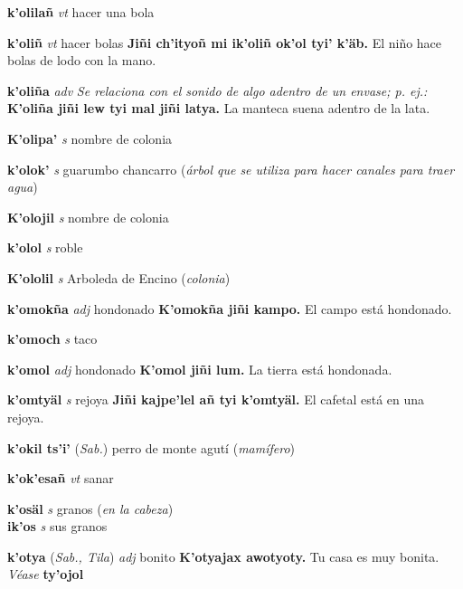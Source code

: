 \documentclass[10pt]{scrbook}
\newcommand{\entry}[1]{\textbf{#1}}
\newcommand{\nontranslationdef}[1]{\textit{#1}}
\newcommand{\partofspeech}[1]{\textit{#1}}
\newcommand{\spanishtranslation}[1]{#1}
\newcommand{\clarification}[1]{(\textit{#1})}
\newcommand{\cholexample}[1]{\textbf{#1}}
\newcommand{\exampletranslation}[1]{#1}
\newcommand{\alsosee}[1]{\\\textit{Véase} \textbf{#1}}
\newcommand{\relevantdialect}[1]{(\textit{#1})}
\newcommand{\secondaryentry}[1]{\\\textbf{#1}}
\newcommand{\secondpartofspeech}[1]{\textit{#1}}
\newcommand{\secondtranslation}[1]{#1}
\begin{document}
\begin{multicols}{2}
\entry{k'olilañ}
\partofspeech{vt}
\spanishtranslation{hacer una bola}

\entry{k'oliñ}
\partofspeech{vt}
\spanishtranslation{hacer bolas}
\cholexample{Jiñi ch'ityoñ mi ik'oliñ ok'ol tyi' k'äb.}
\exampletranslation{El niño hace bolas de lodo con la mano.}

\entry{k'oliña}
\partofspeech{adv}
\nontranslationdef{Se relaciona con el sonido de algo adentro de un envase; p. ej.:}
\cholexample{K'oliña jiñi lew tyi mal jiñi latya.}
\exampletranslation{La manteca suena adentro de la lata.}

\entry{K'olipa'}
\partofspeech{s}
\spanishtranslation{nombre de colonia}

\entry{k'olok'}
\partofspeech{s}
\spanishtranslation{guarumbo}
\spanishtranslation{chancarro}
\clarification{árbol que se utiliza para hacer canales para traer agua}

\entry{K'olojil}
\partofspeech{s}
\spanishtranslation{nombre de colonia}

\entry{k'olol}
\partofspeech{s}
\spanishtranslation{roble}

\entry{K'ololil}
\partofspeech{s}
\spanishtranslation{Arboleda de Encino}
\clarification{colonia}

\entry{k'omokña}
\partofspeech{adj}
\spanishtranslation{hondonado}
\cholexample{K'omokña jiñi kampo.}
\exampletranslation{El campo está hondonado.}

\entry{k'omoch}
\partofspeech{s}
\spanishtranslation{taco}

\entry{k'omol}
\partofspeech{adj}
\spanishtranslation{hondonado}
\cholexample{K'omol jiñi lum.}
\exampletranslation{La tierra está hondonada.}

\entry{k'omtyäl}
\partofspeech{s}
\spanishtranslation{rejoya}
\cholexample{Jiñi kajpe'lel añ tyi k'omtyäl.}
\exampletranslation{El cafetal está en una rejoya.}

\entry{k'okil ts'i'}
\relevantdialect{Sab.}
\spanishtranslation{perro de monte}
\spanishtranslation{agutí}
\clarification{mamífero}

\entry{k'ok'esañ}
\partofspeech{vt}
\spanishtranslation{sanar}

\entry{k'osäl}
\partofspeech{s}
\spanishtranslation{granos}
\clarification{en la cabeza}
\secondaryentry{ik'os}
\secondpartofspeech{s}
\secondtranslation{sus granos}

\entry{k'otya}
\relevantdialect{Sab., Tila}
\partofspeech{adj}
\spanishtranslation{bonito}
\cholexample{K'otyajax awotyoty.}
\exampletranslation{Tu casa es muy bonita.}
\alsosee{ty'ojol}


\end{multicols}
\end{document}
